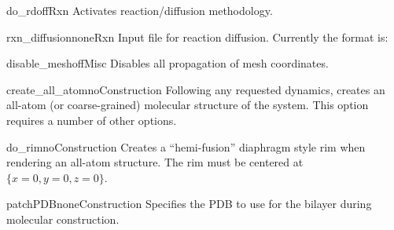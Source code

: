 \begin{optionSummary}{do\_rd}{off}{Rxn}
Activates reaction/diffusion methodology.
\end{optionSummary}
\begin{optionSummary}{rxn\_diffusion}{none}{Rxn}
Input file for reaction diffusion.
Currently the format is:\par
{}
\end{optionSummary}


\begin{optionSummary}{disable\_mesh}{off}{Misc}
Disables all propagation of mesh coordinates.
\end{optionSummary}


\begin{optionSummary}{create\_all\_atom}{no}{Construction}
Following any requested dynamics, creates an all-atom (or coarse-grained) molecular structure of the system.
This option requires a number of other options.
\end{optionSummary}

\begin{optionSummary}{do\_rim}{no}{Construction}
Creates a ``hemi-fusion'' diaphragm style rim when rendering an all-atom structure.
The rim must be centered at $\{x=0,y=0,z=0\}$.
\end{optionSummary}

\begin{optionSummary}{patchPDB}{none}{Construction}
Specifies the PDB to use for the bilayer during molecular construction.
\end{optionSummary}


